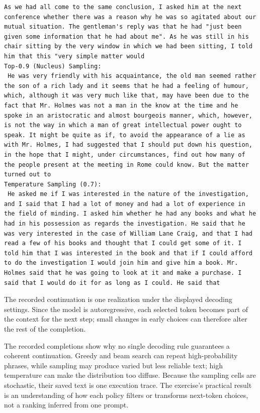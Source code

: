 \documentclass[../labs.tex]{subfiles}
\begin{document}
\begin{lstlisting}[style=terminalOutput,breakatwhitespace=false,columns=fullflexible]
As we had all come to the same conclusion, I asked him at the next conference whether there was a reason why he was so agitated about our mutual situation. The gentleman's reply was that he had "just been given some information that he had about me". As he was still in his chair sitting by the very window in which we had been sitting, I told him that this "very simple matter would
Top-0.9 (Nucleus) Sampling:
 He was very friendly with his acquaintance, the old man seemed rather the son of a rich lady and it seems that he had a feeling of humour, which, although it was very much like that, may have been due to the fact that Mr. Holmes was not a man in the know at the time and he spoke in an aristocratic and almost bourgeois manner, which, however, is not the way in which a man of great intellectual power ought to speak. It might be quite as if, to avoid the appearance of a lie as with Mr. Holmes, I had suggested that I should put down his question, in the hope that I might, under circumstances, find out how many of the people present at the meeting in Rome could know. But the matter turned out to
Temperature Sampling (0.7):
 He asked me if I was interested in the nature of the investigation, and I said that I had a lot of money and had a lot of experience in the field of minding. I asked him whether he had any books and what he had in his possession as regards the investigation. He said that he was very interested in the case of William Lane Craig, and that I had read a few of his books and thought that I could get some of it. I told him that I was interested in the book and that if I could afford to do the investigation I would join him and give him a book. Mr. Holmes said that he was going to look at it and make a purchase. I said that I would do it for as long as I could. He said that

\end{lstlisting}

The recorded continuation is one realization under the displayed decoding settings. Since the model is autoregressive, each selected token becomes part of the context for the next step; small changes in early choices can therefore alter the rest of the completion.

The recorded completions show why no single decoding rule guarantees a coherent continuation. Greedy and beam search can repeat high-probability phrases, while sampling may produce varied but less reliable text; high temperature can make the distribution too diffuse. Because the sampling cells are stochastic, their saved text is one execution trace. The exercise’s practical result is an understanding of how each policy filters or transforms next-token choices, not a ranking inferred from one prompt.
\end{document}
